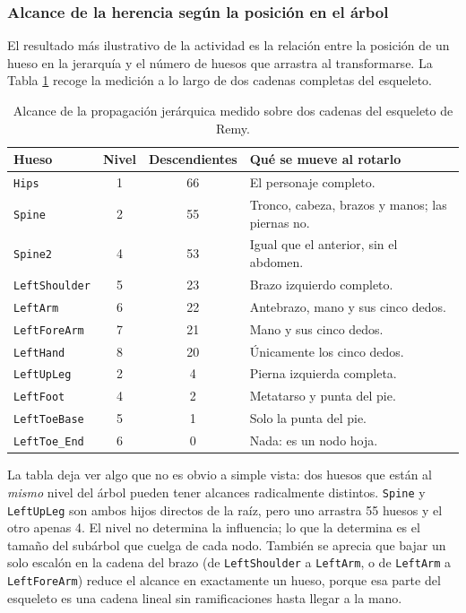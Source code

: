 \subsubsection{Alcance de la herencia según la posición en el árbol}
El resultado más ilustrativo de la actividad es la relación entre la posición de un hueso en la jerarquía y el número de huesos que arrastra al transformarse. La Tabla \ref{tab:alcance_fk} recoge la medición a lo largo de dos cadenas completas del esqueleto.

\begin{table}[H]
\centering
\small
\begin{tabular}{@{}lccp{7.4cm}@{}}
\toprule
\textbf{Hueso} & \textbf{Nivel} & \textbf{Descendientes} & \textbf{Qué se mueve al rotarlo} \\
\midrule
\texttt{Hips}         & 1 & 66 & El personaje completo. \\
\texttt{Spine}        & 2 & 55 & Tronco, cabeza, brazos y manos; las piernas no. \\
\texttt{Spine2}       & 4 & 53 & Igual que el anterior, sin el abdomen. \\
\texttt{LeftShoulder} & 5 & 23 & Brazo izquierdo completo. \\
\texttt{LeftArm}      & 6 & 22 & Antebrazo, mano y sus cinco dedos. \\
\texttt{LeftForeArm}  & 7 & 21 & Mano y sus cinco dedos. \\
\texttt{LeftHand}     & 8 & 20 & Únicamente los cinco dedos. \\
\midrule
\texttt{LeftUpLeg}    & 2 &  4 & Pierna izquierda completa. \\
\texttt{LeftFoot}     & 4 &  2 & Metatarso y punta del pie. \\
\texttt{LeftToeBase}  & 5 &  1 & Solo la punta del pie. \\
\texttt{LeftToe\_End} & 6 &  0 & Nada: es un nodo hoja. \\
\bottomrule
\end{tabular}
\caption{Alcance de la propagación jerárquica medido sobre dos cadenas del esqueleto de Remy.}
\label{tab:alcance_fk}
\end{table}

La tabla deja ver algo que no es obvio a simple vista: dos huesos que están al \textit{mismo} nivel del árbol pueden tener alcances radicalmente distintos. \texttt{Spine} y \texttt{LeftUpLeg} son ambos hijos directos de la raíz, pero uno arrastra 55 huesos y el otro apenas 4. El nivel no determina la influencia; lo que la determina es el tamaño del subárbol que cuelga de cada nodo. También se aprecia que bajar un solo escalón en la cadena del brazo (de \texttt{LeftShoulder} a \texttt{LeftArm}, o de \texttt{LeftArm} a \texttt{LeftForeArm}) reduce el alcance en exactamente un hueso, porque esa parte del esqueleto es una cadena lineal sin ramificaciones hasta llegar a la mano.

